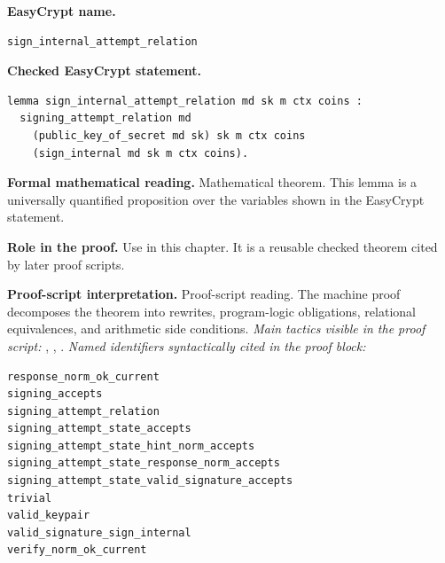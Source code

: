 \begin{formaltheorem}
\noindent\textbf{EasyCrypt name.}
\begin{lstlisting}[language=EasyCrypt,basicstyle=\ttfamily\scriptsize]
sign_internal_attempt_relation
\end{lstlisting}
\noindent\textbf{Checked EasyCrypt statement.}
\begin{lstlisting}[language=EasyCrypt,basicstyle=\ttfamily\scriptsize]
lemma sign_internal_attempt_relation md sk m ctx coins :
  signing_attempt_relation md
    (public_key_of_secret md sk) sk m ctx coins
    (sign_internal md sk m ctx coins).
\end{lstlisting}
\noindent\textbf{Formal mathematical reading.}
Mathematical theorem. This lemma is a universally quantified proposition over the variables shown in the EasyCrypt statement.

\noindent\textbf{Role in the proof.}
Use in this chapter. It is a reusable checked theorem cited by later proof scripts.

\noindent\textbf{Proof-script interpretation.}
Proof-script reading. The machine proof decomposes the theorem into rewrites, program-logic obligations, relational equivalences, and arithmetic side conditions.
\emph{Main tactics visible in the proof script:} , , .
\emph{Named identifiers syntactically cited in the proof block:}
\begin{lstlisting}[language=EasyCrypt,basicstyle=\ttfamily\scriptsize]
response_norm_ok_current
signing_accepts
signing_attempt_relation
signing_attempt_state_accepts
signing_attempt_state_hint_norm_accepts
signing_attempt_state_response_norm_accepts
signing_attempt_state_valid_signature_accepts
trivial
valid_keypair
valid_signature_sign_internal
verify_norm_ok_current
\end{lstlisting}

\end{formaltheorem}

